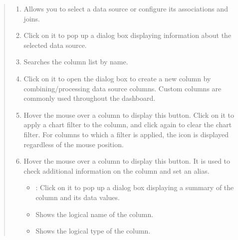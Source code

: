 \documentclass[letterpaper,10pt,english]{sphinxmanual}
\begin{document}
\begin{quote}

\begin{figure}[H]
\centering

\noindent{}
\end{figure}
\begin{enumerate}
\def\theenumi{\arabic{enumi}}
\def\labelenumi{\theenumi .}
\makeatletter\def\p@enumii{\p@enumi \theenumi .}\makeatother
\item {} 
 Allows you to select a data source or configure its associations and joins.

\item {} 
 Click on it to pop up a dialog box displaying information about the selected data source.

\item {} 
 Searches the column list by name.

\item {} 
 Click on it to open the dialog box to create a new column by combining/processing data source columns. Custom columns are commonly used throughout the dashboard.

\item {} 
 Hover the mouse over a column to display this button. Click on it to apply a chart filter to the column, and click again to clear the chart filter. For columns to which a filter is applied, the  icon is displayed regardless of the mouse position.

\item {} 
 Hover the mouse over a column to display this button. It is used to check additional information on the column and set an alias.
\begin{itemize}
\item {} 
 : Click on it to pop up a dialog box displaying a summary of the column and its data values.

\item {} 
 Shows the logical name of the column.

\item {} 
 Shows the logical type of the column.


\end{itemize}
\end{enumerate}
\end{quote}
\end{document}
